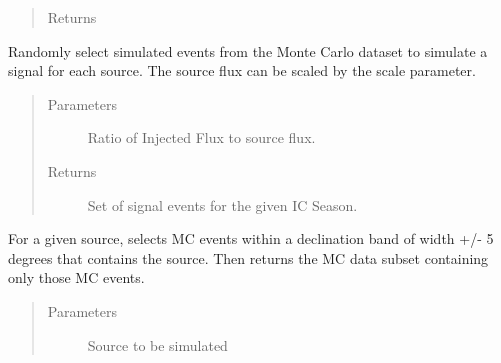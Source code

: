 \documentclass[letterpaper,10pt,english]{sphinxmanual}
\begin{document}
\begin{fulllineitems}
\begin{fulllineitems}
\begin{quote}
\begin{description}
\item[{Returns}] \leavevmode


\end{description}\end{quote}

\end{fulllineitems}


\begin{fulllineitems}
\label{\detokenize{index:flarestack.core.injector.MCInjector.get_band_mask}}
\end{fulllineitems}


\begin{fulllineitems}
\label{\detokenize{index:flarestack.core.injector.MCInjector.inject_signal}}
Randomly select simulated events from the Monte Carlo dataset to
simulate a signal for each source. The source flux can be scaled by
the scale parameter.
\begin{quote}\begin{description}
\item[{Parameters}] \leavevmode
{} \textendash{} Ratio of Injected Flux to source flux.

\item[{Returns}] \leavevmode
Set of signal events for the given IC Season.

\end{description}\end{quote}

\end{fulllineitems}


\begin{fulllineitems}
\label{\detokenize{index:flarestack.core.injector.MCInjector.select_mc_band}}
For a given source, selects MC events within a declination band of
width +/- 5 degrees that contains the source. Then returns the MC data
subset containing only those MC events.
\begin{quote}\begin{description}
\item[{Parameters}] \leavevmode
{} \textendash{} Source to be simulated


\end{description}
\end{quote}
\end{fulllineitems}
\end{fulllineitems}
\end{document}
